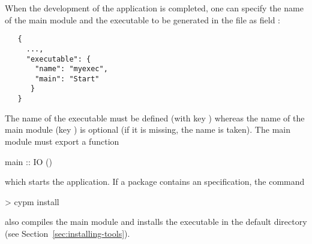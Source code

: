 When the development of the application is completed,
one can specify the name of the main module and the executable
to be generated in the file 
as field :
%
\begin{verbatim}
   {
     ...,
     "executable": {
       "name": "myexec",
       "main": "Start"
      }
   }
\end{verbatim}
%
The name of the executable must be defined (with key )
whereas the name of the main module (key ) is optional
(if it is missing, the name  is taken).
The main module must export a function
%
\begin{prog}
main :: IO ()
\end{prog}
%
which starts the application.
If a package contains an  specification,
the command
%
\begin{prog}
> cypm install
\end{prog}
%
also compiles the main module and installs the executable
in the default directory
 (see Section~\ref{sec:installing-tools}).



